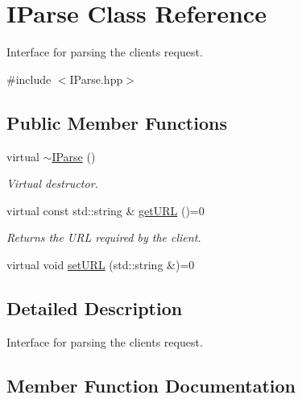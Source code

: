 \hypertarget{class_i_parse}{}\section{I\+Parse Class Reference}
\label{class_i_parse}


Interface for parsing the client\textquotesingle{}s request.  




{\ttfamily \#include $<$I\+Parse.\+hpp$>$}

\subsection*{Public Member Functions}
\begin{DoxyCompactItemize}
\item 
\hypertarget{class_i_parse_a72f8e36290a53f75e6922e43ea7baacc}{}virtual \hyperlink{class_i_parse_a72f8e36290a53f75e6922e43ea7baacc}{$\sim$\+I\+Parse} ()\label{class_i_parse_a72f8e36290a53f75e6922e43ea7baacc}

\begin{DoxyCompactList}\small\item\em Virtual destructor. \end{DoxyCompactList}\item 
\hypertarget{class_i_parse_a99e7d39bb53fe8cac0e4d2cef63f9352}{}virtual const std\+::string \& \hyperlink{class_i_parse_a99e7d39bb53fe8cac0e4d2cef63f9352}{get\+U\+R\+L} ()=0\label{class_i_parse_a99e7d39bb53fe8cac0e4d2cef63f9352}

\begin{DoxyCompactList}\small\item\em Returns the U\+R\+L required by the client. \end{DoxyCompactList}\item 
virtual void \hyperlink{class_i_parse_aac1e9d916cbb5097599ad3743d80d96c}{set\+U\+R\+L} (std\+::string \&)=0
\end{DoxyCompactItemize}


\subsection{Detailed Description}
Interface for parsing the client\textquotesingle{}s request. 

\subsection{Member Function Documentation}
\hypertarget{class_i_parse_aac1e9d916cbb5097599ad3743d80d96c}{}
